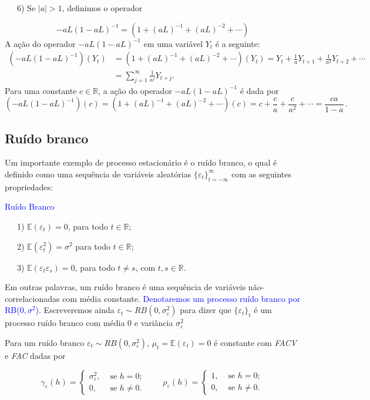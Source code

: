 \documentclass[
]{book}
\theoremstyle{definition}
\theoremstyle{definition}
\theoremstyle{definition}
\theoremstyle{remark}
\begin{document}
~~~6) Se \(|a| > 1\), definimos o operador

\[ -aL( 1-aL)^{-1}=(1 + (aL)^{-1} + (aL)^{-2} +\cdots) \]
A ação do operador \(-aL(1-aL)^{-1}\) em uma variável \(Y_t\) é a seguinte:
\begin{align*}
(-aL(1-aL)^{-1})(Y_t)&=(1 + (aL)^{-1} + (aL)^{-2} +\cdots)(Y_t)= Y_t+\frac{1}{a}Y_{t+1}+\frac{1}{a^2}Y_{t+2}+\cdots\\
&=\sum_{j=1}^\infty \frac{1}{a^j}Y_{t+j}.
\end{align*}
Para uma constante \(c\in\mathbb{R}\), a ação do operador \(-aL(1-aL)^{-1}\) é dada por
\[(-aL(1-aL)^{-1})(c)=(1 + (aL)^{-1} + (aL)^{-2} +\cdots)(c)= c+\frac{c}{a}+\frac{c}{a^2}+\cdots=\frac{ca}{1-a}\,.\]

\hypertarget{ruuxeddo-branco}{%
\subsection{Ruído branco}\label{ruuxeddo-branco}}

Um importante exemplo de processo estacionário é o ruído branco, o qual é definido
como uma sequência de variáveis aleatórias \(\{\varepsilon_t \}_{t=-\infty}^{\infty}\) com as
seguintes propriedades:

\textcolor{blue}{Ruído Branco}

~~~1) \(\mathbb{E}(\varepsilon_t)=0\), para todo \(t\in\mathbb{R}\);

~~~2) \(\mathbb{E}(\varepsilon_t^2)=\sigma^2\) para todo \(t\in\mathbb{R}\);

~~~3) \(\mathbb{E}(\varepsilon_t\varepsilon_s)=0\), para todo \(t\neq s\), com \(t,s\in\mathbb{R}\).

Em outras palavras, um ruído branco é uma sequência de variáveis não-correlacionadas com média constante. \textcolor{blue}{ Denotaremos um processo ruído branco por RB($0,\sigma^2$)}. Escreveremos ainda \(\varepsilon_t\sim RB(0,\sigma_\varepsilon^2)\) para dizer que \(\{\varepsilon_t\}_{t}\) é um processo ruído branco com média 0 e variância \(\sigma^2_\varepsilon\)

Para um ruído branco \(\varepsilon_t\sim RB(0,\sigma_\varepsilon^2)\), \(\mu_t = \mathbb{E} (\varepsilon_t )=0\) é constante com \emph{FACV} e \emph{FAC} dadas por

\[
\gamma_\varepsilon(h) =\left\{
\begin{array}{cc}
\sigma^2_\varepsilon, & \mbox{ se  } h=0;\\
0, & \mbox{ se } h\neq0.
\end{array}\right.\qquad
\rho_\varepsilon(h) =\left\{\begin{array}{cc}
1, & \mbox{ se  } h=0;\\
0, & \mbox{ se } h \neq 0.
\end{array}\right.
\]
\end{document}
